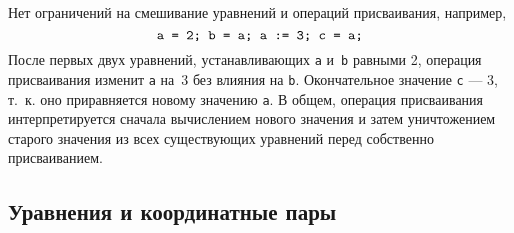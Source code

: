 \documentclass{article} %
\begin{document}
Нет ограничений на смешивание уравнений и операций присваивания, например, 
$$ \hbox{\tt a = 2; b = a; a := 3; c = a;} $$
После первых двух уравнений, устанавливающих {\tt a} и~{\tt b} равными 2, 
операция присваивания изменит {\tt a} на~3 без влияния на {\tt b}.
Окончательное значение {\tt c} --- 3, т.~к. оно приравняется новому 
значению {\tt a}.
В общем, операция присваивания интерпретируется сначала вычислением нового 
значения и затем уничтожением старого значения из всех существующих уравнений 
перед собственно присваиванием.

\subsection{Уравнения и координатные пары}
\end{document}
